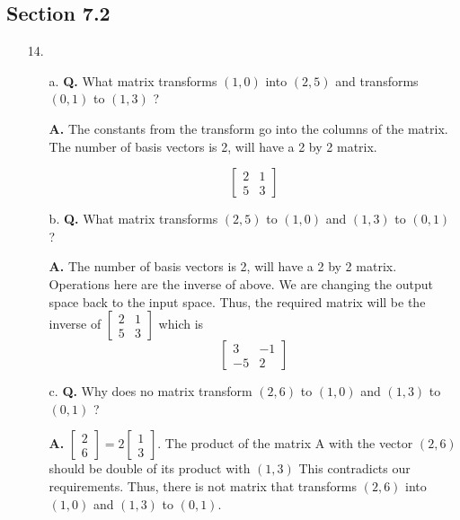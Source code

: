 \documentclass[main.tex]{subfiles}
\begin{document}
\subsection{Section 7.2}
\begin{enumerate}
    \item [14.] 
    \begin{enumerate}
        \item [a.] \textbf{Q.} What matrix transforms $(1,0)$ into $(2,5)$ and transforms $(0,1)$ to $(1,3)$ ? 
        
        \textbf{A.} The constants from the transform go into the columns of the matrix. The number of basis vectors is 2, will have a 2 by 2 matrix.
    
        $$
        \left[\begin{array}{ll}
        2 & 1 \\
        5 & 3
        \end{array}\right]
        $$
        
        \item [b.] \textbf{Q.} What matrix transforms $(2,5)$ to $(1,0)$ and $(1,3)$ to $(0,1)$ ? 
        
        \textbf{A.} The number of basis vectors is 2, will have a 2 by 2 matrix. Operations here are the inverse of above. We are changing the output space back to the input space. Thus, the required matrix will be the inverse of $\left[\begin{array}{ll}2 & 1 \\ 5 & 3\end{array}\right]$ which is
        $$
        \left[\begin{array}{cc}
        3 & -1 \\
        -5 & 2
        \end{array}\right]
        $$
        
        \item [c.] \textbf{Q.} Why does no matrix transform $(2,6)$ to $(1,0)$ and $(1,3)$ to $(0,1)$ ? 
        
        \textbf{A.}  $\left[\begin{array}{l}2 \\ 6\end{array}\right]=2\left[\begin{array}{l}1 \\ 3\end{array}\right]$. The product of the matrix A with the vector $(2,6)$ should be double of its product with $(1,3)$ This contradicts our requirements. Thus, there is not matrix that transforms $(2,6)$ into $(1,0)$ and $(1,3)$ to $(0,1)$.
        
    \end{enumerate}
\end{enumerate}
\end{document}
